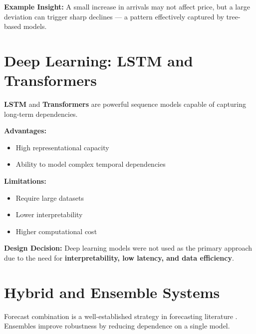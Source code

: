 \documentclass[12pt,a4paper]{report}
\begin{document}
\vspace{0.4em}

\noindent
\textbf{Example Insight:}  
A small increase in arrivals may not affect price, but a large deviation can trigger sharp declines — a pattern effectively captured by tree-based models.

\vspace{0.7em}


\section{Deep Learning: LSTM and Transformers}

\noindent
\textbf{LSTM} \cite{hochreiter1997} and \textbf{Transformers} \cite{vaswani2017} are powerful sequence models capable of capturing long-term dependencies.

\vspace{0.4em}

\noindent
\textbf{Advantages:}
\begin{itemize}
    \item High representational capacity
    \item Ability to model complex temporal dependencies
\end{itemize}

\textbf{Limitations:}
\begin{itemize}
    \item Require large datasets
    \item Lower interpretability
    \item Higher computational cost
\end{itemize}

\vspace{0.4em}

\noindent
\textbf{Design Decision:}  
Deep learning models were not used as the primary approach due to the need for \textbf{interpretability, low latency, and data efficiency}.

\vspace{0.7em}


\section{Hybrid and Ensemble Systems}

\noindent
Forecast combination is a well-established strategy in forecasting literature \cite{makridakis2018}. Ensembles improve robustness by reducing dependence on a single model.
\end{document}
